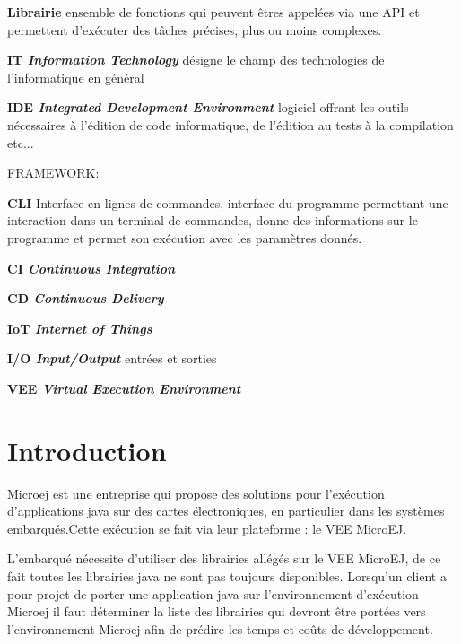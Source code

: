 \documentclass[french,a4paper,12pt]{report}
\begin{document}
\bigskip

\hypertarget{Librairie}{\noindent\textbf{Librairie} ensemble de fonctions qui peuvent êtres appelées via une API et permettent d'exécuter des tâches précises, plus ou moins complexes.}

\bigskip

\hypertarget{IT}{\noindent\textbf{IT \emph{Information Technology}} désigne le champ des technologies de  l'informatique en général}

\bigskip

\hypertarget{IDE}{\noindent\textbf{IDE \emph{Integrated Development Environment}} logiciel offrant les outils nécessaires à l'édition de code informatique, de l'édition au tests à la compilation etc...}

\bigskip

FRAMEWORK:

\bigskip

\hypertarget{CLI}{\noindent\textbf{CLI} Interface en lignes de commandes, interface du programme permettant une interaction dans un terminal de commandes, donne des informations sur le programme et permet son exécution avec les paramètres donnés. }

\bigskip

\hypertarget{CI}{\noindent\textbf{CI \emph{Continuous Integration}}}

\bigskip

\hypertarget{CD}{\noindent\textbf{CD \emph{Continuous Delivery}}} 

\bigskip

\hypertarget{IoT}{\noindent\textbf{IoT \emph{Internet of Things}}} 

\bigskip

\hypertarget{IO}{\noindent\textbf{I/O \emph{Input/Output}} entrées et sorties}

\bigskip

\hypertarget{VEE}{\noindent\textbf{VEE \emph{Virtual Execution Environment}} }


\chapter{Introduction}

Microej est une entreprise qui propose des solutions pour  l’exécution d’applications java sur des cartes électroniques, en particulier dans les systèmes embarqués.Cette exécution se fait via leur plateforme : le VEE MicroEJ.

L'embarqué nécessite d’utiliser des librairies allégés sur le VEE MicroEJ, de ce fait toutes les librairies java ne sont pas toujours disponibles. Lorsqu’un client a pour projet de porter une application java sur l’environnement d’exécution Microej il faut déterminer la liste des librairies qui devront être portées vers l’environnement Microej afin de prédire les temps et coûts de développement.
\end{document}
